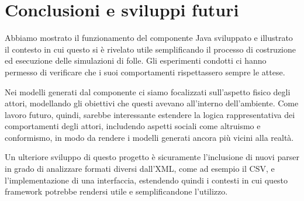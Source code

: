 \chapter{Conclusioni e sviluppi futuri}
Abbiamo mostrato il funzionamento del componente Java sviluppato e illustrato il contesto in cui questo si è rivelato utile semplificando il processo di costruzione ed esecuzione delle simulazioni di folle. Gli esperimenti condotti ci hanno permesso di verificare che i suoi comportamenti rispettassero sempre le attese. 

Nei modelli generati dal componente ci siamo focalizzati sull'aspetto fisico degli attori, modellando gli obiettivi che questi avevano all'interno dell'ambiente. Come lavoro futuro, quindi, sarebbe interessante estendere la logica rappresentativa dei comportamenti degli attori, includendo aspetti sociali come altruismo e conformismo, in modo da rendere i modelli generati ancora più vicini alla realtà. 

Un ulteriore sviluppo di questo progetto è sicuramente l'inclusione di nuovi parser in grado di analizzare formati diversi dall'XML, come ad esempio il CSV, e l'implementazione di una interfaccia, estendendo quindi i contesti in cui questo framework potrebbe rendersi utile e semplificandone l'utilizzo.